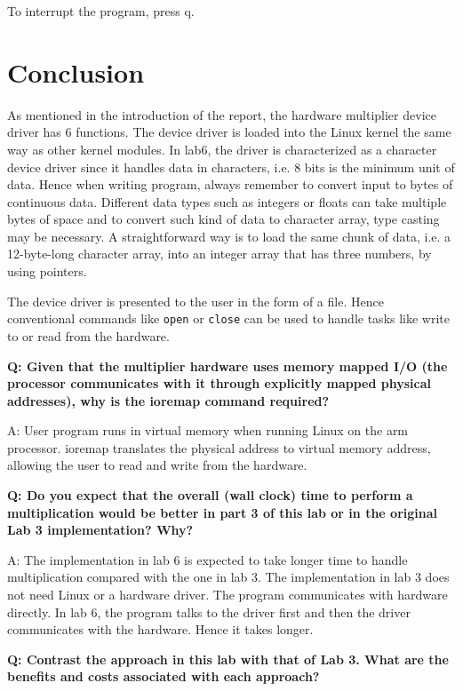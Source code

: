 \documentclass[11pt,letterpaper,titlepage]{article}
\begin{document}
To interrupt the program, press q.

\newpage

\part{Conclusion}

As mentioned in the introduction of the report, the hardware multiplier device driver has 6 functions. The device driver is loaded into the Linux kernel the same way as other kernel modules. In lab6, the driver is characterized as a character device driver since it handles data in characters, i.e. 8 bits is the minimum unit of data. Hence when writing program, always remember to convert input to bytes of continuous data. Different data types such as integers or floats can take multiple bytes of space and to convert such kind of data to character array, type casting may be necessary. A straightforward way is to load the same chunk of data, i.e. a 12-byte-long character array, into an integer array that has three numbers, by using pointers.

The device driver is presented to the user in the form of a file. Hence conventional commands like \texttt{open} or \texttt{close} can be used to handle tasks like write to or read from the hardware.

\textbf{Q: Given that the multiplier hardware uses memory mapped I/O (the processor communicates with
it through explicitly mapped physical addresses), why is the ioremap command required?}

A: User program runs in virtual memory when running Linux on the arm processor. ioremap translates the physical address to virtual memory address, allowing the user to read and write from the hardware.

\textbf{Q: Do you expect that the overall (wall clock) time to perform a multiplication would be better in part 3 of this lab or in the original Lab 3 implementation? Why?}

A: The implementation in lab 6 is expected to take longer time to handle multiplication compared with the one in lab 3. The implementation in lab 3 does not need Linux or a hardware driver. The program communicates with hardware directly. In lab 6, the program talks to the driver first and then the driver communicates with the hardware. Hence it takes longer.

\textbf{Q: Contrast the approach in this lab with that of Lab 3. What are the benefits and costs associated with each approach?}
\end{document}
